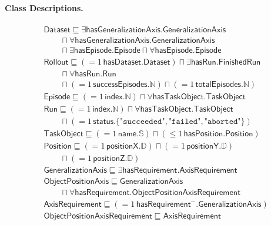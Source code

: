 \documentclass[11pt]{article}
\begin{document}
\paragraph{Class Descriptions.}

\[
\begin{aligned}
&\mathsf{Dataset} \sqsubseteq \exists\mathsf{hasGeneralizationAxis}.\mathsf{GeneralizationAxis}\\
  &\qquad \sqcap \forall\mathsf{hasGeneralizationAxis}.\mathsf{GeneralizationAxis}\\
  &\qquad \sqcap \exists\mathsf{hasEpisode}.\mathsf{Episode} \sqcap \forall\mathsf{hasEpisode}.\mathsf{Episode}\\
&\mathsf{Rollout} \sqsubseteq ({=}1\,\mathsf{hasDataset}.\mathsf{Dataset}) \sqcap \exists\mathsf{hasRun}.\mathsf{FinishedRun}\\
  &\qquad \sqcap \forall\mathsf{hasRun}.\mathsf{Run}\\
  &\qquad \sqcap ({=}1\,\mathsf{successEpisodes}.\mathbb{N}) \sqcap ({=}1\,\mathsf{totalEpisodes}.\mathbb{N})\\
&\mathsf{Episode} \sqsubseteq ({=}1\,\mathsf{index}.\mathbb{N}) \sqcap \forall\mathsf{hasTaskObject}.\mathsf{TaskObject}\\
&\mathsf{Run} \sqsubseteq ({=}1\,\mathsf{index}.\mathbb{N}) \sqcap \forall\mathsf{hasTaskObject}.\mathsf{TaskObject}\\
  &\qquad \sqcap ({=}1\,\mathsf{status}.\{\texttt{"succeeded"},\texttt{"failed"},\texttt{"aborted"}\})\\
&\mathsf{TaskObject} \sqsubseteq ({=}1\,\mathsf{name}.\mathbb{S}) \sqcap ({\leq}1\,\mathsf{hasPosition}.\mathsf{Position})\\
&\mathsf{Position} \sqsubseteq ({=}1\,\mathsf{positionX}.\mathbb{D}) \sqcap ({=}1\,\mathsf{positionY}.\mathbb{D})\\
  &\qquad \sqcap ({=}1\,\mathsf{positionZ}.\mathbb{D})\\
&\mathsf{GeneralizationAxis} \sqsubseteq \exists\mathsf{hasRequirement}.\mathsf{AxisRequirement}\\
&\mathsf{ObjectPositionAxis} \sqsubseteq \mathsf{GeneralizationAxis}\\
  &\qquad \sqcap \forall\mathsf{hasRequirement}.\mathsf{ObjectPositionAxisRequirement}\\
&\mathsf{AxisRequirement} \sqsubseteq ({=}1\,\mathsf{hasRequirement}^{-}.\mathsf{GeneralizationAxis})\\
&\mathsf{ObjectPositionAxisRequirement} \sqsubseteq \mathsf{AxisRequirement}\\

\end{aligned}\]
\end{document}
